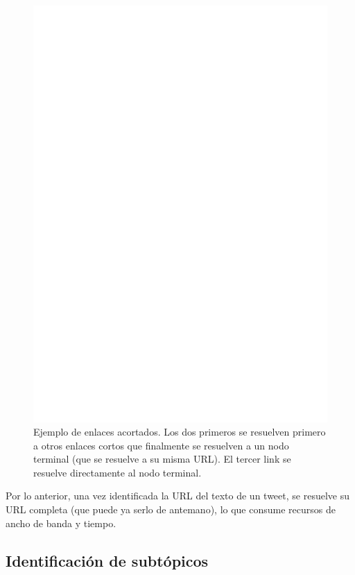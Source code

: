   \begin{figure}[h]
  \centering
  \includegraphics[width=16cm]{./dia/shortlinks.ps}
  \caption[Ejemplo de enlaces acortados.]
   {Ejemplo de enlaces acortados. Los dos primeros se resuelven
  primero a otros enlaces cortos que finalmente se resuelven a un
  nodo terminal (que se resuelve a su misma URL). El tercer link se
  resuelve directamente al nodo terminal.\label{fig:short}}
  \end{figure}

    Por lo anterior, una vez identificada la URL del texto de un
    tweet, se resuelve su URL completa (que puede ya serlo de
    antemano), lo que consume recursos de ancho de banda y
    tiempo.

\subsection{Identificación de subtópicos}
\label{sec-4.2.2}


